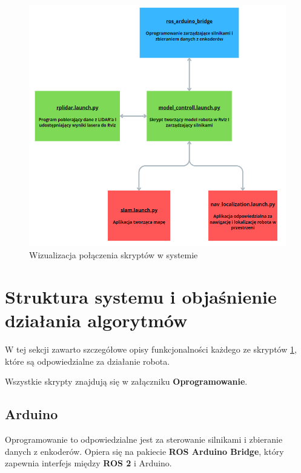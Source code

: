 \documentclass[a4paper,twoside,12pt]{book}
\begin{document}
\begin{figure}[!hb]
	\centering
	\includegraphics[width=1\textwidth]{images/diagram-programy.png}
	\caption{Wizualizacja połączenia skryptów w systemie}
	\label{fig:diagram-programy}
\end{figure}


\newpage
\section{Struktura systemu i objaśnienie działania algorytmów}

W tej sekcji zawarto szczegółowe opisy funkcjonalności każdego ze skryptów \ref{fig:diagram-programy}, które są odpowiedzialne za działanie robota.

Wszystkie skrypty znajdują się w załączniku  \textbf{Oprogramowanie}.
\subsection{Arduino}
Oprogramowanie to odpowiedzialne jest za sterowanie silnikami i zbieranie danych z enkoderów. Opiera się na pakiecie \textbf{ROS Arduino Bridge}, który zapewnia interfejs między \textbf{ROS 2} i Arduino. 
\end{document}
